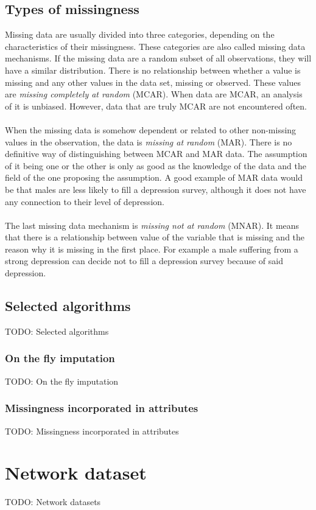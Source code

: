 \documentclass[11pt]{article}
\begin{document}
    \subsection{Types of missingness}
      Missing data are usually divided into three categories, depending on the characteristics of their missingness. These categories are also called missing data mechanisms. If the missing data are a random subset of all observations, they will have a similar distribution. There is no relationship between whether a value is missing and any other values in the data set, missing or observed. These values are {\it missing completely at random} (MCAR). When data are MCAR, an analysis of it is unbiased. However, data that are truly MCAR are not encountered often.
      \\~\\
      When the missing data is somehow dependent or related to other non-missing values in the observation, the data is {\it missing at random} (MAR). There is no definitive way of distinguishing between MCAR and MAR data. The assumption of it being one or the other is only as good as the knowledge of the data and the field of the one proposing the assumption. A good example of MAR data would be that males are less likely to fill a depression survey, although it does not have any connection to their level of depression.
      \\~\\
      The last missing data mechanism is {\it missing not at random} (MNAR). It means that there is a relationship between value of the variable that is missing and the reason why it is missing in the first place. For example a male suffering from a strong depression can decide not to fill a depression survey because of said depression.
    \subsection{Selected algorithms}
      TODO: Selected algorithms
      \subsubsection{On the fly imputation}
        TODO: On the fly imputation
      \subsubsection{Missingness incorporated in attributes}
        TODO: Missingness incorporated in attributes
  \newpage
  \section{Network dataset}
    TODO: Network datasets
\end{document}

